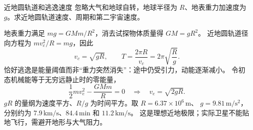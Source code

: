 \begin{origexamplebox}{近地圆轨道和逃逸速度}\label{ch11:ex:01}
忽略大气和地球自转，地球半径为 $R$、地表重力加速度为 $g$。求近地圆轨道速度、周期和第二宇宙速度。

\ThQOrbit
\end{origexamplebox}
\begin{xesolution}
\ThAOrbit

地表重力满足 $mg=GMm/R^2$，消去试探物体质量得 $GM=gR^2$。
近地圆轨道径向方程为 $mv_c^2/R=mg$，因此
\[
 \boxed{v_c=\sqrt{gR}},\qquad
 \boxed{T=\frac{2\pi R}{v_c}=2\pi\sqrt{\frac Rg}}.
\]
恰好逃逸是能量阈值而非“重力突然消失”：途中仍受引力，动能逐渐减小。
令初态机械能等于无穷远静止时的零能量，
\[
 \frac12mv_e^2-\frac{GMm}{R}=0
 \quad\Longrightarrow\quad\boxed{v_e=\sqrt{2gR}}.
\]
$gR$ 的量纲为速度平方、$R/g$ 为时间平方。取 $R=6.37\times10^6\,\mathrm m$、
$g=9.81\,\mathrm{m/s^2}$，分别约为 $7.9\,\mathrm{km/s}$、$84.4\,\mathrm{min}$ 和 $11.2\,\mathrm{km/s}$。
这是理想近地极限；实际卫星不能贴地飞行，需避开地形与大气阻力。
\end{xesolution}

